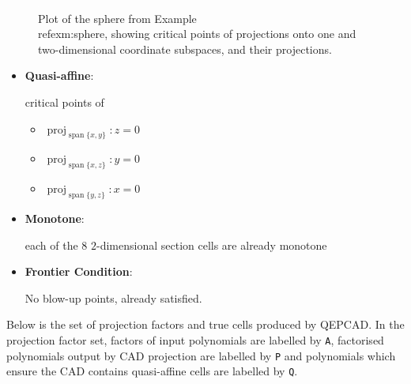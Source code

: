 \documentclass[
]{book}
\providecommand{\tightlist}{%
  \setlength{\itemsep}{0pt}\setlength{\parskip}{0pt}}
\theoremstyle{definition}
\theoremstyle{definition}
\theoremstyle{definition}
\theoremstyle{definition}
\theoremstyle{remark}
\begin{document}
\begin{figure}

{\centering \includegraphics[width=0.6\linewidth]{gnuplot/sphere} 

}

\caption{Plot of the sphere from Example \\ref{exm:sphere}, showing critical points of projections onto one and two-dimensional coordinate subspaces, and their projections.}\label{fig:unnamed-chunk-3}
\end{figure}

\begin{itemize}
\item
  \textbf{Quasi-affine}:

  critical points of

  \begin{itemize}
  \tightlist
  \item
    \({\operatorname{proj}_{{\operatorname{span} \{x,y\}}}}: z = 0\)
  \item
    \({\operatorname{proj}_{{\operatorname{span} \{x,z\}}}}: y = 0\)
  \item
    \({\operatorname{proj}_{{\operatorname{span} \{y,z\}}}}: x = 0\)
  \end{itemize}
\item
  \textbf{Monotone}:

  each of the 8 \(2\)-dimensional section cells are already monotone
\item
  \textbf{Frontier Condition}:

  No blow-up points, already satisfied.
\end{itemize}

Below is the set of projection factors and true cells produced by QEPCAD. In the projection factor set, factors of input polynomials are labelled by \texttt{A}, factorised polynomials output by CAD projection are labelled by \texttt{P} and polynomials which ensure the CAD contains quasi-affine cells are labelled by \texttt{Q}.
\end{document}
